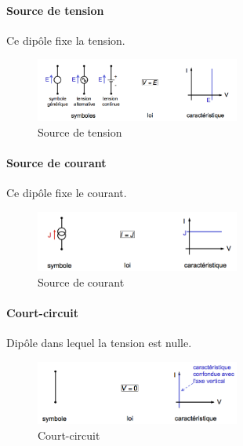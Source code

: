 \documentclass[a4paper]{article}
\begin{document}
    \paragraph{Source de tension} Ce dipôle fixe la tension.
    \begin{figure}[H]
        \begin{center}
            \includegraphics[width=0.6\textwidth]{fig/2_sourcetension.png}
            \caption{Source de tension}
        \end{center}
    \end{figure}

    \paragraph{Source de courant} Ce dipôle fixe le courant.
    \begin{figure}[H]
        \begin{center}
            \includegraphics[width=0.6\textwidth]{fig/2_sourcecourant.png}
            \caption{Source de courant}
        \end{center}
    \end{figure}

    \paragraph{Court-circuit} Dipôle dans lequel la tension est nulle.
    \begin{figure}[H]
        \begin{center}
            \includegraphics[width=0.6\textwidth]{fig/2_courtcircuit.png}
            \caption{Court-circuit}
        \end{center}
    \end{figure}
\end{document}

